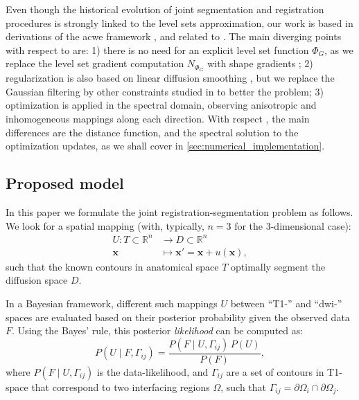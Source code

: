 Even though the historical evolution
of joint segmentation and registration procedures is strongly linked
to the level sets approximation, our work is based in derivations of
the \gls{acwe} framework \citep{chan_active_2001}, and related to
\citep{le_guyader_combined_2011}.
{\color{red} {The main diverging points with respect to
\citep{gorthi_active_2011} are: 1) there is no need for an explicit level set function
$\Phi_G$, as we replace the level set gradient computation $N_{\Phi_G}$ with shape
gradients \citep{jehan-besson_dream2s:_2003,herbulot_segmentation_2006};
2) regularization is also based on linear diffusion smoothing \citep{thirion_image_1998},
but we replace the Gaussian filtering by other constraints
studied in \citep{nagel_investigation_1986} to better the problem;
3) optimization is applied in the spectral
domain, observing anisotropic and inhomogeneous mappings along each direction.
With respect \citep{le_guyader_combined_2011}, the main differences are
the distance function, and the spectral solution to the optimization updates,
as we shall cover in \autoref{sec:numerical_implementation}.}}



\subsection{Proposed model}
\label{sec:methods_map}
In this paper we formulate the joint registration-segmentation
problem as follows. We look for a spatial mapping (with, typically,
$n=3$ for the 3-dimensional case):
\begin{align*}
U\colon T \subset \mathbb{R}^n &\to D \subset \mathbb{R}^n \\
\mathbf{x} &\mapsto \mathbf{x}' =\mathbf{x}+u(\mathbf{x}),
\end{align*}
such that the known contours in anatomical space $T$ optimally segment
the diffusion space $D$.

In a Bayesian framework, different such mappings $U$ between ``T1-''
and ``\gls*{dwi}-'' spaces are evaluated based on their posterior
probability given the observed data $F$. Using the Bayes' rule, this
posterior \emph{likelihood} can be computed as:
\begin{equation}
P(U \mid F,\Gamma_{ij}) = \frac{P(F \mid U,\Gamma_{ij})\, P(U)}{P(F)},
\label{eq:bayes_rule}
\end{equation}
where $P(F \mid U,\Gamma_{ij})$ is the data-likelihood, and
$\Gamma_{ij}$ are a set of contours in T1-space that correspond to
two interfacing regions $\Omega$, such that 
$\Gamma_{ij} = \partial \Omega_i \cap \partial \Omega_j$.

